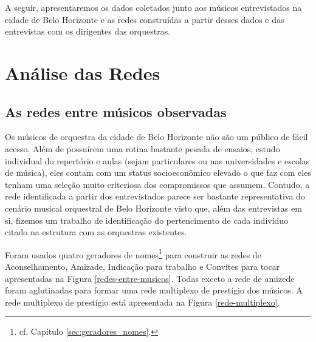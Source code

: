 \documentclass[a4paper, 12pt, openright, oneside, german, french, english, brazil]{abntex2}
\begin{document}
	A seguir, apresentaremos os dados coletados junto aos músicos entrevistados na cidade de Belo Horizonte e as redes construídas a partir desses dados e das entrevistas com os dirigentes das orquestras.
	
	
	
	\chapter{Análise das Redes}
	
	\section{As redes entre músicos observadas}
	
	
	Os músicos de orquestra da cidade de Belo Horizonte não são um público de fácil acesso. Além de possuírem uma rotina bastante pesada de ensaios, estudo individual do repertório e aulas (sejam particulares ou nas universidades e escolas de música), eles contam com um status socioeconômico elevado o que faz com eles tenham uma seleção muito criteriosa dos compromissos que assumem. Contudo, a rede identificada a partir dos entrevistados parece ser bastante representativa do cenário musical orquestral de Belo Horizonte visto que, além das entrevistas em si, fizemos um trabalho de identificação do pertencimento de cada indivíduo citado na estrutura com as orquestras existentes.
	
	Foram usados quatro geradores de nomes\footnote{cf. Capítulo \ref{sec:geradores_nomes}.} para construir as redes de Aconselhamento, Amizade, Indicação para trabalho e Convites para tocar apresentadas na Figura \ref{redes-entre-musicos}. 	Todas exceto a rede de amizede foram aglutinadas para formar uma rede multiplexo de prestígio dos músicos. A rede multiplexo de prestígio está apresentada na Figura \ref{rede-multiplexo}.
	
\end{document}
